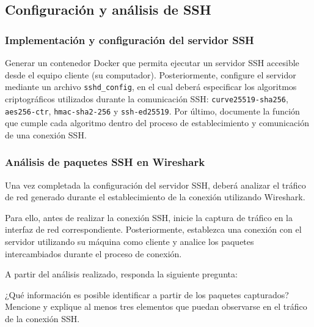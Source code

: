 \documentclass[letter,12pt]{article}
\begin{document}
\subsection{Configuración y análisis de SSH}
\subsubsection{Implementación y configuración del servidor SSH}

    Generar un contenedor Docker que permita ejecutar un servidor SSH accesible desde el equipo cliente (su computador). Posteriormente, configure el servidor mediante un archivo \texttt{sshd\_config}, en el cual deberá especificar los algoritmos criptográficos utilizados durante la comunicación SSH: \texttt{curve25519-sha256}, \texttt{aes256-ctr}, \texttt{hmac-sha2-256} y \texttt{ssh-ed25519}. Por último, documente la función que cumple cada algoritmo dentro del proceso de establecimiento y comunicación de una conexión SSH.


\subsubsection{Análisis de paquetes SSH en Wireshark}

    Una vez completada la configuración del servidor SSH, deberá analizar el tráfico de red generado durante el establecimiento de la conexión utilizando Wireshark.

    Para ello, antes de realizar la conexión SSH, inicie la captura de tráfico en la interfaz de red correspondiente. Posteriormente, establezca una conexión con el servidor utilizando su máquina como cliente y analice los paquetes intercambiados durante el proceso de conexión.

    A partir del análisis realizado, responda la siguiente pregunta:

    ¿Qué información es posible identificar a partir de los paquetes capturados? Mencione y explique al menos tres elementos que puedan observarse en el tráfico de la conexión SSH.

    
    
\end{document}
